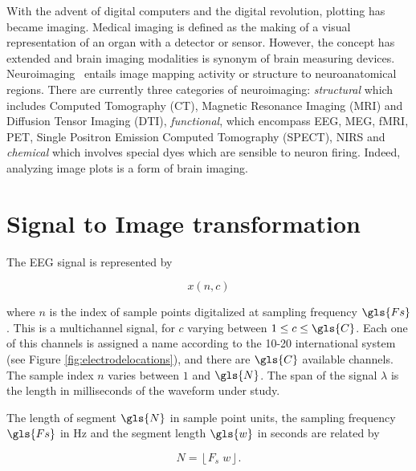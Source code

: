 
\begin{story}[Neuroimaging]
With the advent of digital computers and the digital revolution, plotting has became imaging.  Medical imaging is defined as the making of a visual representation of an organ with a detector or sensor.  However, the concept has extended and brain imaging modalities is  synonym of brain measuring devices.  Neuroimaging~\cite{Freeman2013} entails image mapping activity or structure to neuroanatomical regions.  There are currently three categories of neuroimaging: \textit{structural} which includes Computed Tomography (CT), Magnetic Resonance Imaging (MRI) and Diffusion Tensor Imaging (DTI), \textit{functional}, which encompass EEG, MEG, fMRI, PET, Single Positron Emission Computed Tomography (SPECT), NIRS and \textit{chemical} which involves special dyes which are sensible to neuron firing.  Indeed, analyzing image plots is a form of brain imaging.
\end{story}


\section{Signal to Image transformation}

The EEG signal is represented by

\begin{equation}
x(n,c)
\label{eq:eegdefinition}
\end{equation}

\noindent where $n$ is the index of sample points digitalized at sampling frequency $\gls{Fs}$.  This is a multichannel signal, for $c$ varying between  $1 \leq c \leq \gls{C}$.  Each one of this channels is assigned a name according to the 10-20 international system (see Figure \ref{fig:electrodelocations}), and there are $\gls{C}$ available channels. The sample index $n$ varies between $1$ and $\gls{N}$.  The span of the signal $\lambda$ is the length in milliseconds of the waveform under study. 

The length of segment $\gls{N}$ in sample point units, the sampling frequency $\gls{Fs}$ in \si{\hertz} and the segment length $\gls{w}$ in seconds are related by

\begin{equation}
N = \left\lfloor F_s \; w \right\rfloor.
\label{eq:segmentlength}
\end{equation}

